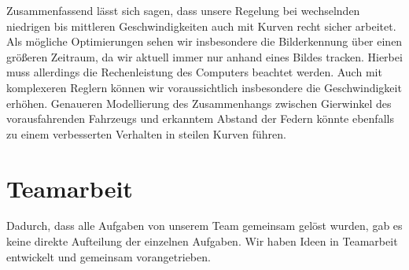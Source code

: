 \documentclass[10pt]{article}
\begin{document}
    Zusammenfassend lässt sich sagen, dass unsere Regelung bei wechselnden niedrigen bis mittleren Geschwindigkeiten auch mit Kurven recht sicher arbeitet.
    Als mögliche Optimierungen sehen wir insbesondere die Bilderkennung über einen größeren Zeitraum, da wir aktuell immer nur anhand eines Bildes tracken.
    Hierbei muss allerdings die Rechenleistung des Computers beachtet werden.
    Auch mit komplexeren Reglern können wir voraussichtlich insbesondere die Geschwindigkeit erhöhen. Genaueren Modellierung des Zusammenhangs zwischen Gierwinkel des vorausfahrenden Fahrzeugs und erkanntem Abstand der Federn könnte ebenfalls zu einem verbesserten Verhalten in steilen Kurven führen.

\section{Teamarbeit}
    Dadurch, dass alle Aufgaben von unserem Team gemeinsam gelöst wurden, gab es keine direkte Aufteilung der einzelnen Aufgaben.
    Wir haben Ideen in Teamarbeit entwickelt und gemeinsam vorangetrieben.
\end{document}
